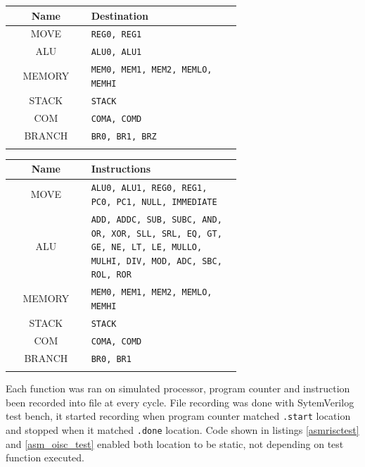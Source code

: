 \begin{blockpage}
	\begin{tabular}{| c | p{0.65\linewidth}|} \hline 
		\rowcolor[rgb]{0.82,0.82,0.82}
		Name & Destination \\\hline
		\arrayrulecolor[rgb]{0.82,0.82,0.82}
		MOVE & \texttt{REG0, REG1} \\\hline
		ALU & \texttt{ALU0, ALU1} \\\hline
		MEMORY & \texttt{MEM0, MEM1, MEM2, MEMLO, MEMHI} \\\hline
		STACK  & \texttt{STACK}\\\hline
		COM & \texttt{COMA, COMD}\\\hline
		BRANCH & \texttt{BR0, BR1, BRZ}\\\hline
		\arrayrulecolor[rgb]{0,0,0}\hline
	\end{tabular}
	\label{tab:instr_groups_oisc_dst}
\end{blockpage}

\begin{blockpage}
	\begin{tabular}{| c | p{0.65\linewidth} |} \hline 
		\rowcolor[rgb]{0.82,0.82,0.82}
		Name & Instructions \\\hline	
		\arrayrulecolor[rgb]{0.82,0.82,0.82}	
		MOVE & \texttt{ALU0, ALU1, REG0, REG1, PC0, PC1, NULL, IMMEDIATE} \\\hline
		ALU & \texttt{ADD, ADDC, SUB, SUBC,
		AND, OR, XOR, SLL,
		SRL, EQ, GT, GE, NE,
		LT, LE, MULLO, MULHI, DIV, MOD,
		ADC, SBC, ROL, ROR} \\\hline
		MEMORY & \texttt{MEM0, MEM1, MEM2, MEMLO, MEMHI} \\\hline
		STACK  & \texttt{STACK} \\\hline
		COM & \texttt{COMA, COMD} \\\hline
		BRANCH & \texttt{BR0, BR1} \\\hline
		\arrayrulecolor[rgb]{0,0,0}\hline
	\end{tabular}
	\label{tab:instr_groups_oisc_src}
\end{blockpage}

Each function was ran on simulated processor, program counter and instruction been recorded into file at every cycle. File recording was done with SytemVerilog test bench, it started recording when program counter matched \texttt{.start} location and stopped when it matched \texttt{.done} location. Code shown in listings \ref{asmrisctest} and \ref{asm_oisc_test} enabled both location to be static, not depending on test function executed.

